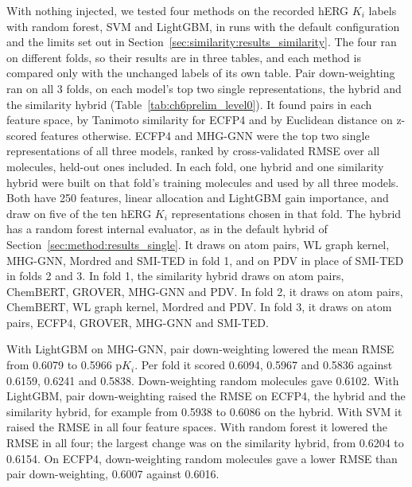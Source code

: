 With nothing injected, we tested four methods on the recorded hERG $K_i$ labels with random forest, SVM and LightGBM, in runs with the default configuration and the limits set out in Section~\ref{sec:similarity:results_similarity}. The four ran on different folds, so their results are in three tables, and each method is compared only with the unchanged labels of its own table. Pair down-weighting ran on all 3 folds, on each model's top two single representations, the hybrid and the similarity hybrid (Table~\ref{tab:ch6prelim_level0}). It found pairs in each feature space, by Tanimoto similarity for ECFP4 and by Euclidean distance on z-scored features otherwise. ECFP4 and MHG-GNN were the top two single representations of all three models, ranked by cross-validated RMSE over all molecules, held-out ones included. In each fold, one hybrid and one similarity hybrid were built on that fold's training molecules and used by all three models. Both have 250 features, linear allocation and LightGBM gain importance, and draw on five of the ten hERG $K_i$ representations chosen in that fold. The hybrid has a random forest internal evaluator, as in the default hybrid of Section~\ref{sec:method:results_single}. It draws on atom pairs, WL graph kernel, MHG-GNN, Mordred and SMI-TED in fold 1, and on PDV in place of SMI-TED in folds 2 and 3. In fold 1, the similarity hybrid draws on atom pairs, ChemBERT, GROVER, MHG-GNN and PDV. In fold 2, it draws on atom pairs, ChemBERT, WL graph kernel, Mordred and PDV. In fold 3, it draws on atom pairs, ECFP4, GROVER, MHG-GNN and SMI-TED.

With LightGBM on MHG-GNN, pair down-weighting lowered the mean RMSE from 0.6079 to 0.5966 p$K_i$. Per fold it scored 0.6094, 0.5967 and 0.5836 against 0.6159, 0.6241 and 0.5838. Down-weighting random molecules gave 0.6102. With LightGBM, pair down-weighting raised the RMSE on ECFP4, the hybrid and the similarity hybrid, for example from 0.5938 to 0.6086 on the hybrid. With SVM it raised the RMSE in all four feature spaces. With random forest it lowered the RMSE in all four; the largest change was on the similarity hybrid, from 0.6204 to 0.6154. On ECFP4, down-weighting random molecules gave a lower RMSE than pair down-weighting, 0.6007 against 0.6016.

